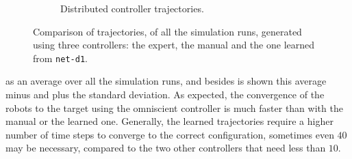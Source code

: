 \begin{figure}[!htb]
\begin{center}
\begin{subfigure}[h]{0.49\textwidth}
			\caption{Distributed controller trajectories.}
		\end{subfigure}
	\end{center}
	\caption[Evaluation of the trajectories learned by \texttt{net-d1}]{Comparison 
	of trajectories, of all the simulation runs, generated 
	using three controllers: the expert, the manual and 
		the one learned from \texttt{net-d1}.}
	\label{fig:net-d1traj}
\end{figure}

\noindent
as an average over all the simulation runs, and 
besides is shown this average minus and plus the standard deviation.
As expected, the convergence of the robots to the target using the omniscient 
controller is much faster than with the manual or the learned one. Generally, the 
learned trajectories require a higher number of time steps to converge to the 
correct configuration, sometimes even $40$ may be necessary, compared to the 
two other controllers that need less than $10$.

